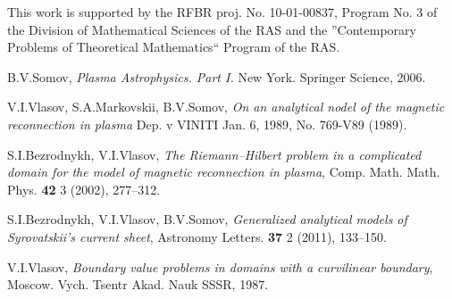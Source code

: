 \documentclass[10pt,a4paper]{article}
\begin{document}
This work is supported by the RFBR proj. No. 10-01-00837,
Program No. 3 of the Division of Mathematical Sciences of the RAS
and the ''Contemporary Problems of Theoretical Mathematics`` 
Program of the RAS.

\begin{thebibliography}{6}

B.V.Somov, \emph{Plasma Astrophysics. Part I.} New York. Springer Science, 2006. 

V.I.Vlasov, S.A.Markovskii, B.V.Somov,
\emph{On an analytical nodel of the magnetic reconnection in plasma} 
Dep. v VINITI Jan. 6, 1989, No. 769-V89 (1989). 

S.I.Bezrodnykh, V.I.Vlasov,
\emph{The Riemann--Hilbert problem in a complicated domain 
for the model of magnetic reconnection in plasma}, Comp. Math. Math. Phys.
\textbf{42} 3 (2002), 277--312. 

S.I.Bezrodnykh, V.I.Vlasov, B.V.Somov,
\emph{Generalized analytical models of Syrovatskii's current sheet},
Astronomy Letters. \textbf{37} 2 (2011), 133--150. 

V.I.Vlasov,
\emph{Boundary value problems in domains with a curvilinear boundary},
Moscow. Vych. Tsentr Akad. Nauk SSSR, 1987. 

\end{thebibliography}
\end{document}
